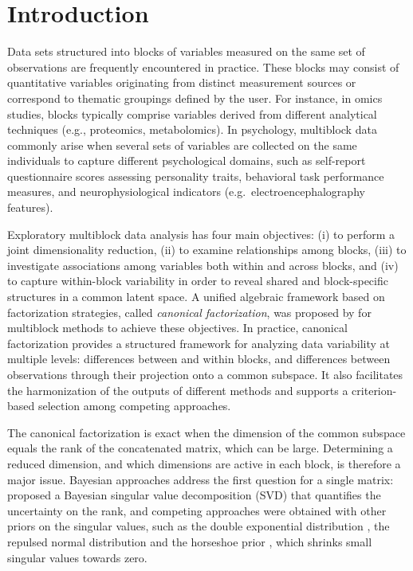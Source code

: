 \documentclass[11pt]{article}
\begin{document}
\section{Introduction}

Data sets structured into blocks of variables measured on the same set of observations are frequently encountered in practice. These blocks may consist of quantitative variables originating from distinct measurement sources or correspond to thematic groupings defined by the user. For instance, in omics studies, blocks typically comprise variables derived from different analytical techniques (e.g., proteomics, metabolomics). In psychology, multiblock data commonly arise when several sets of variables are collected on the same individuals to capture different psychological domains, such as self-report questionnaire scores assessing personality traits, behavioral task performance measures, and neurophysiological indicators (e.g.\ electroencephalography features).

Exploratory multiblock data analysis has four main objectives: (i) to perform a joint dimensionality reduction, (ii) to examine relationships among blocks, (iii) to investigate associations among variables both within and across blocks, and (iv) to capture within-block variability in order to reveal shared and block-specific structures in a common latent space.
A unified algebraic framework based on factorization strategies, called \textit{canonical factorization}, was proposed by \citet{bougeard2024} for multiblock methods to achieve these objectives. In practice, canonical factorization provides a structured framework for analyzing data variability at multiple levels: differences between and within blocks, and
differences between observations through their projection onto a common subspace. It also facilitates the harmonization of the outputs of different methods and supports a criterion-based selection among competing approaches.

The canonical factorization is exact when the dimension of the common subspace equals the rank of the concatenated matrix, which can be large. Determining a reduced dimension, and which dimensions are active in each block, is therefore a major issue. Bayesian approaches address the first question for a single matrix: \cite{hoff2007} proposed a Bayesian singular value decomposition (SVD) that quantifies the uncertainty on the rank, and competing approaches were obtained with other priors on the singular values, such as the
double exponential distribution \citep{zhai2023}, the repulsed normal distribution \citep{yuchi2023} and the horseshoe prior \citep{wang2026}, which shrinks small singular values towards zero.
\end{document}
